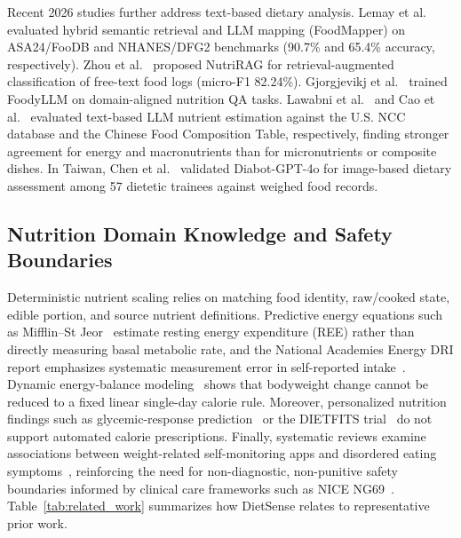 \documentclass[conference]{IEEEtran}
\begin{document}
Recent 2026 studies further address text-based dietary analysis. Lemay et al.~\cite{lemay2026foodmapper} evaluated hybrid semantic retrieval and LLM mapping (FoodMapper) on ASA24/FooDB and NHANES/DFG2 benchmarks (90.7\% and 65.4\% accuracy, respectively). Zhou et al.~\cite{zhou2026nutrirag} proposed NutriRAG for retrieval-augmented classification of free-text food logs (micro-F1 82.24\%). Gjorgjevikj et al.~\cite{gjorgjevikj2026foodyllm} trained FoodyLLM on domain-aligned nutrition QA tasks. Lawabni et al.~\cite{lawabni2026text} and Cao et al.~\cite{cao2026chinese} evaluated text-based LLM nutrient estimation against the U.S. NCC database and the Chinese Food Composition Table, respectively, finding stronger agreement for energy and macronutrients than for micronutrients or composite dishes. In Taiwan, Chen et al.~\cite{chen2025diabot} validated Diabot-GPT-4o for image-based dietary assessment among 57 dietetic trainees against weighed food records.

\subsection{Nutrition Domain Knowledge and Safety Boundaries}
Deterministic nutrient scaling relies on matching food identity, raw/cooked state, edible portion, and source nutrient definitions. Predictive energy equations such as Mifflin--St Jeor~\cite{mifflin1990ree} estimate resting energy expenditure (REE) rather than directly measuring basal metabolic rate, and the National Academies Energy DRI report emphasizes systematic measurement error in self-reported intake~\cite{nasem2023dri}. Dynamic energy-balance modeling~\cite{hall2011bodyweight} shows that bodyweight change cannot be reduced to a fixed linear single-day calorie rule. Moreover, personalized nutrition findings such as glycemic-response prediction~\cite{zeevi2015personalized} or the DIETFITS trial~\cite{gardner2018dietfits} do not support automated calorie prescriptions. Finally, systematic reviews examine associations between weight-related self-monitoring apps and disordered eating symptoms~\cite{roth2024selfmonitoring,anderberg2025apps}, reinforcing the need for non-diagnostic, non-punitive safety boundaries informed by clinical care frameworks such as NICE NG69~\cite{nice2020ng69}. Table~\ref{tab:related_work} summarizes how DietSense relates to representative prior work.
\end{document}
